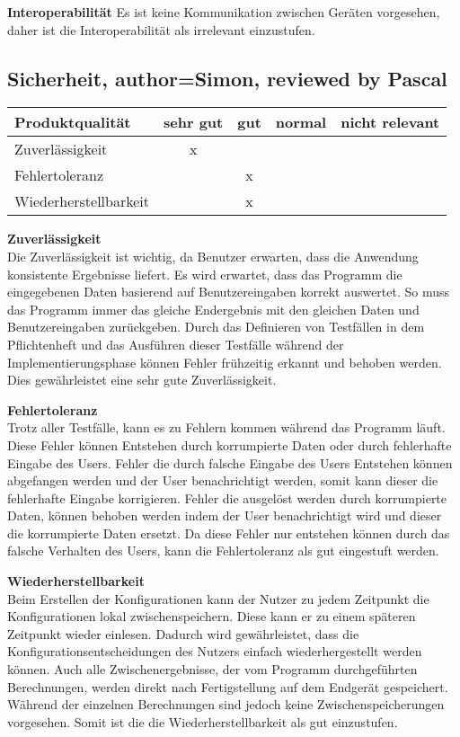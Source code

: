 \documentclass[parskip=full]{scrartcl} %
\begin{document}
\textbf{Interoperabilität}
\newline
Es ist keine Kommunikation zwischen Geräten vorgesehen, daher ist die Interoperabilität als irrelevant einzustufen.


\newpage 

\subsection{Sicherheit, author=Simon, reviewed by Pascal}

    \begin{tabular}{|l| c| c| c| c|}
    \hline
        Produktqualität & sehr gut & gut & normal & nicht relevant \\
    \hline
        Zuverlässigkeit & x & & &\\
    \hline
        Fehlertoleranz & & x & &\\
    \hline
        Wiederherstellbarkeit & & x & &\\
    \hline
     \end{tabular}

\textbf{Zuverlässigkeit\\}
Die Zuverlässigkeit ist wichtig, da Benutzer erwarten, dass die Anwendung konsistente Ergebnisse liefert.
Es wird erwartet, dass das Programm die eingegebenen Daten basierend auf Benutzereingaben korrekt auswertet.
So muss das Programm immer das gleiche Endergebnis mit den gleichen Daten und Benutzereingaben zurückgeben.
Durch das Definieren von Testfällen in dem Pflichtenheft und das Ausführen dieser Testfälle während der Implementierungsphase können Fehler frühzeitig erkannt und behoben werden.
Dies gewährleistet eine sehr gute Zuverlässigkeit.

\textbf{Fehlertoleranz\\}
Trotz aller Testfälle, kann es zu Fehlern kommen während das Programm läuft. Diese Fehler können Entstehen durch korrumpierte Daten oder durch fehlerhafte Eingabe des Users.
Fehler die durch falsche Eingabe des Users Entstehen können abgefangen werden und der User benachrichtigt werden, somit kann dieser die fehlerhafte Eingabe korrigieren.
Fehler die ausgelöst werden durch korrumpierte Daten, können behoben werden indem der User benachrichtigt wird und dieser die korrumpierte Daten ersetzt.
Da diese Fehler nur entstehen können durch das falsche Verhalten des Users, kann 
die Fehlertoleranz als gut eingestuft werden.

\textbf{Wiederherstellbarkeit\\}
Beim Erstellen der Konfigurationen kann der Nutzer zu jedem Zeitpunkt die Konfigurationen lokal zwischenspeichern. Diese kann er zu einem späteren Zeitpunkt wieder einlesen. Dadurch wird gewährleistet, dass die Konfigurationsentscheidungen des Nutzers einfach wiederhergestellt werden können.
Auch alle Zwischenergebnisse, der vom Programm durchgeführten Berechnungen, werden direkt nach Fertigstellung auf dem Endgerät gespeichert. Während der einzelnen Berechnungen sind jedoch keine Zwischenspeicherungen vorgesehen.
Somit ist die die Wiederherstellbarkeit als gut einzustufen.
\end{document}
